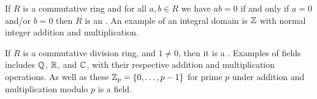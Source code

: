     
    If \(R\) is a commutative ring and for all \(a, b\in R\) we have \(ab = 0\) if and only if \(a = 0\) and/or \(b = 0\) then \(R\) is an .
    An example of an integral domain is \(\mathbb{Z}\) with normal integer addition and multiplication.
    
    If \(R\) is a commutative division ring, and \(1\ne 0\), then it is a .
    Examples of fields includes \(\mathbb{Q}\), \(\mathbb{R}\), and \(\mathbb{C}\), with their respective addition and multiplication operations.
    As well as these \(\mathbb{Z}_p = \{0, \dotsc, p-1\}\) for prime \(p\) under addition and multiplication modulo \(p\) is a field.

